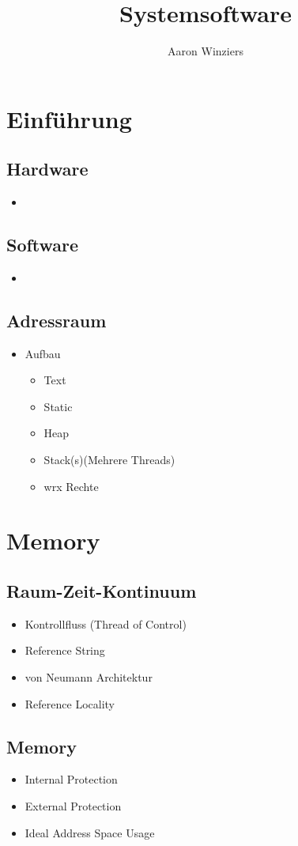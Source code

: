\documentclass[10pt,a4paper]{article}
\author{Aaron Winziers}
\title{Systemsoftware}
\begin{document}
	\section{Einführung}
		\subsection{Hardware}
			\begin{itemize}
				\item 
			\end{itemize}
		\subsection{Software}
			\begin{itemize}
				\item 
			\end{itemize}
		\subsection{Adressraum}
			\begin{itemize}
				\item Aufbau
					\begin{itemize}
						\item Text 
						\item Static
						\item Heap
						\item Stack(s)(Mehrere Threads)
						\item wrx Rechte
					\end{itemize}
			\end{itemize}
	\section{Memory}
		\subsection{Raum-Zeit-Kontinuum}
			\begin{itemize}
				\item Kontrollfluss (Thread of Control)
				\item Reference String
				\item von Neumann Architektur
				\item Reference Locality 
			\end{itemize}
		\subsection{Memory}
			\begin{itemize}
				\item Internal Protection
				\item External Protection
				\item Ideal Address Space Usage
			\end{itemize}
\end{document}
